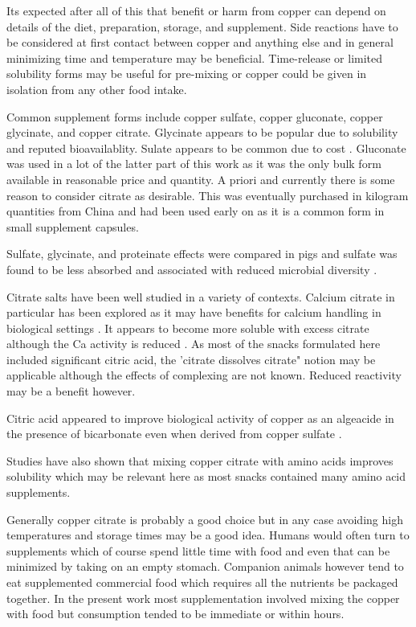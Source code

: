 Its expected after all of this that benefit or harm from
copper can depend on details of the diet, preparation, storage, and
supplement. Side reactions have to be considered at first contact
between copper and anything else and in general minimizing time
and temperature may be beneficial.  Time-release or limited
solubility forms may be useful for pre-mixing or copper could be
given in isolation from any other food intake.

Common supplement forms include copper sulfate, copper gluconate,
copper glycinate, and copper citrate.  Glycinate appears to be popular
due to solubility and reputed bioavailablity. Sulate appears to be
common due to cost \cite{Wu_Tan_Shi_vitro_bioaccessibility_2024}. 
Gluconate was used in a lot of the latter
part of this work as it was the only bulk form available in 
reasonable price and quantity. A priori and currently there is some
reason to consider citrate as desirable. This was eventually
purchased in kilogram quantities from China and had been used
early on as it is a common form in small supplement capsules.

Sulfate, glycinate, and proteinate effects were compared
in pigs and sulfate was found to be less absorbed and associated
with reduced microbial diversity \cite{PMC8718720}. 


Citrate salts have been well studied in a variety of contexts.
Calcium citrate in particular  has been explored as
it may have benefits for calcium handling in 
biological settings 
\cite{Liu_Skibsted_Citrate_calcium_transport_2023}.
It appears to become more soluble
with excess citrate although the Ca activity is reduced
\cite{Vavrusova_Skibsted_Aqueous_solubility_calcium_2016}.
As most of the snacks formulated here included significant
citric acid, the 'citrate dissolves citrate" notion may be
applicable although the effects of complexing are not 
known. Reduced reactivity may be a benefit however.

Citric acid appeared to improve biological activity
of copper as an algeacide in the presence of bicarbonate
even when derived from copper sulfate
\cite{Swader_Chan_Citric_acid_enhancement_1975}.

Studies have also shown that mixing copper citrate
with amino acids improves solubility
\cite{Sobel_Haigney_Kim_complexation_aqueous_}
which may be relevant here as most snacks contained
many amino acid supplements. 


Generally copper citrate is probably a good choice but in any
case avoiding high temperatures and storage times may be a good
idea. Humans would often turn to supplements which of course
spend little time with food and even that can be minimized
by taking on an empty stomach. Companion animals however
tend to eat supplemented commercial food which requires all the
nutrients be packaged together. In the present work most supplementation 
involved mixing the copper with food but consumption tended to 
be immediate or within hours.  
